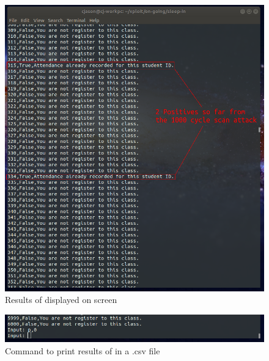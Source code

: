 \documentclass[runningheads]{llncs}
\begin{document}
\begin{figure}
\includegraphics[width=\textwidth]{imgres/sleepin_display.png}
\caption{Results of \scanattack{} displayed on screen} 
\label{fig:sleepin_display}
\end{figure}

\begin{figure}
\includegraphics[width=\textwidth]{imgres/sleepin_csv.png}
\caption{Command to print results of \scanattack{} in a .csv file} 
\label{fig:sleepin_csv}
\end{figure}
\end{document}
